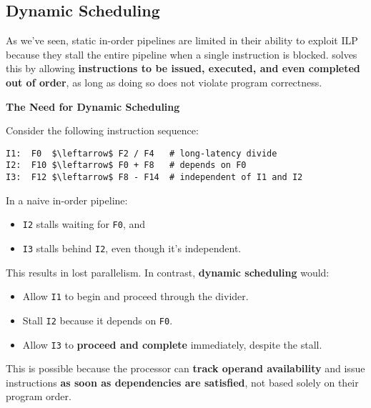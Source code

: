 \subsection{Dynamic Scheduling}\label{subsection: Dynamic Scheduling}

As we've seen, static in-order pipelines are limited in their ability to exploit ILP because they stall the entire pipeline when a single instruction is blocked.  solves this by allowing \textbf{instructions to be issued, executed, and even completed out of order}, as long as doing so does not violate program correctness.

\highspace
\begin{flushleft}
    \textcolor{Red2}{ \textbf{The Need for Dynamic Scheduling}}
\end{flushleft}
Consider the following instruction sequence:
\begin{lstlisting}[language=riscv, mathescape=true]
I1:  F0  $\leftarrow$ F2 / F4   # long-latency divide
I2:  F10 $\leftarrow$ F0 + F8   # depends on F0
I3:  F12 $\leftarrow$ F8 - F14  # independent of I1 and I2
\end{lstlisting}
In a naive in-order pipeline:
\begin{itemize}
    \item \texttt{I2} stalls waiting for \texttt{F0}, and
    \item \texttt{I3} stalls behind \texttt{I2}, even though it's independent.
\end{itemize}
This results in lost parallelism. In contrast, \textbf{dynamic scheduling} would:
\begin{itemize}
    \item Allow \texttt{I1} to begin and proceed through the divider.
    \item Stall \texttt{I2} because it depends on \texttt{F0}.
    \item Allow \texttt{I3} to \textbf{proceed and complete} immediately, despite the stall.
\end{itemize}
This is possible because the processor can \textbf{track operand availability} and issue instructions \textbf{as soon as dependencies are satisfied}, not based solely on their program order.

